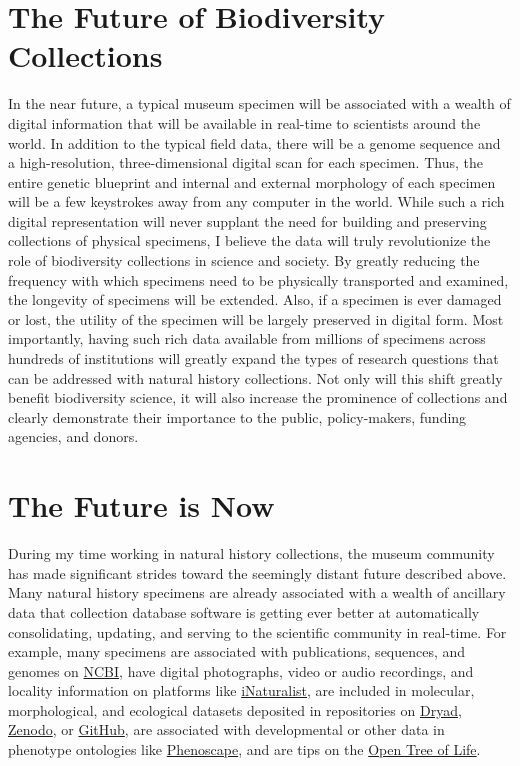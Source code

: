 \documentclass[10pt]{article}
\begin{document}
\section*{The Future of Biodiversity Collections}
In the near future, a typical museum specimen will be associated
with a wealth of digital information that will be available in real-time
to scientists around the world.
In addition to the typical field data, there will be a genome sequence and a
high-resolution, three-dimensional digital scan for each specimen.
Thus, the entire genetic blueprint and internal and external morphology of 
each specimen will be a few keystrokes away from any computer in the world.
While such a rich digital representation will never supplant the need for
building and preserving collections of physical specimens, I believe the data
will truly revolutionize the role of biodiversity collections in science and
society.
By greatly reducing the frequency with which specimens need to be physically
transported and examined, the longevity of specimens will be extended.
Also, if a specimen is ever damaged or lost, the utility of the specimen will
be largely preserved in digital form.
Most importantly, having such rich data available from millions of specimens
across hundreds of institutions will greatly expand the types of research
questions that can be addressed with natural history collections.
Not only will this shift greatly benefit biodiversity science, it will also
increase the prominence of collections and clearly demonstrate their importance
to the public, policy-makers, funding agencies, and donors.


\section*{The Future is Now}
During my time working in natural history collections, the museum
community has made significant strides toward the seemingly distant
future described above.
Many natural history specimens are already associated with a wealth of
ancillary data that collection database software is getting ever better at
automatically consolidating,
updating, and serving to the scientific community in real-time.
For example, many specimens 
are associated with publications, sequences, and genomes on
\href{http://www.ncbi.nlm.nih.gov}{NCBI},
have digital photographs, video or audio recordings, and locality information
on platforms like
\href{https://www.inaturalist.org/}{iNaturalist},
are included in molecular, morphological, and ecological datasets deposited in
repositories on
\href{http://datadryad.org}{Dryad},
\href{https://zenodo.org/}{Zenodo},
or
\href{https://github.com/}{GitHub},
are associated with developmental or other data in
phenotype ontologies
like
\href{https://phenoscape.org/}{Phenoscape},
and are tips on the
\href{http://opentreeoflife.org}{Open Tree of Life}.
\end{document}
